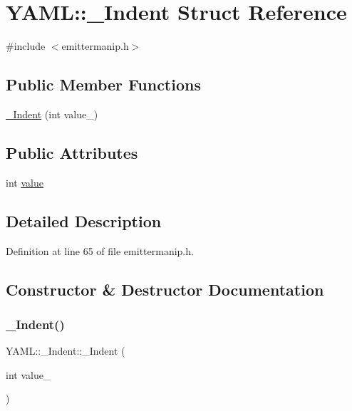 \hypertarget{struct_y_a_m_l_1_1___indent}{}\section{Y\+A\+ML\+::\+\_\+\+Indent Struct Reference}
\label{struct_y_a_m_l_1_1___indent}


{\ttfamily \#include $<$emittermanip.\+h$>$}

\subsection*{Public Member Functions}
\begin{DoxyCompactItemize}
\item 
\mbox{\hyperlink{struct_y_a_m_l_1_1___indent_ae641665e911dfb5cf2cb7a1c7f12cf70}{\+\_\+\+Indent}} (int value\+\_\+)
\end{DoxyCompactItemize}
\subsection*{Public Attributes}
\begin{DoxyCompactItemize}
\item 
int \mbox{\hyperlink{struct_y_a_m_l_1_1___indent_a3ea7eaff092b40d67e5488e03d97c56f}{value}}
\end{DoxyCompactItemize}


\subsection{Detailed Description}


Definition at line 65 of file emittermanip.\+h.



\subsection{Constructor \& Destructor Documentation}
\mbox{\label{struct_y_a_m_l_1_1___indent_ae641665e911dfb5cf2cb7a1c7f12cf70}} 
\subsubsection{\texorpdfstring{\_Indent()}{\_Indent()}}
{\footnotesize\ttfamily Y\+A\+M\+L\+::\+\_\+\+Indent\+::\+\_\+\+Indent (\begin{DoxyParamCaption}\item[{int}]{value\+\_\+ }\end{DoxyParamCaption})\hspace{0.3cm}{\ttfamily [inline]}}



